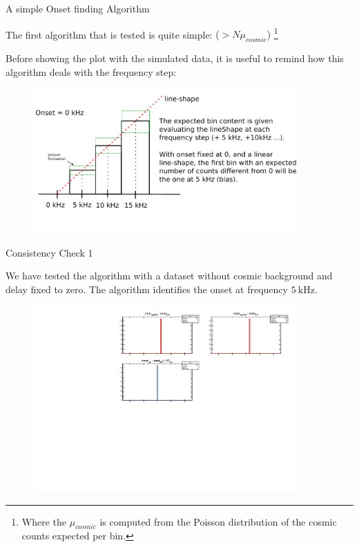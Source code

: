 \documentclass[9pt]{beamer}
\begin{document}
\begin{frame}{A simple Onset finding Algorithm}

The first algorithm that is tested is quite simple: { ($> N\mu_{cosmic}$)} \footnote{Where the $\mu_{cosmic}$ is computed from the Poisson distribution of the cosmic counts expected per bin.}

Before showing the plot with the simulated data, it is useful to remind how this algorithm deals with the frequency step:

\begin{figure}
\includegraphics[width = 0.9\textwidth]{ExplainingAlgorithm1.pdf}
\end{figure}
\end{frame}

\begin{frame}{Consistency Check 1}

We have tested the algorithm with a dataset without cosmic background and delay fixed to zero. The algorithm identifies the onset at frequency $\SI{5}{\kilo \hertz}$.

\begin{figure}
\includegraphics[width = 0.9\textwidth]{../Plot/OnsetResult.pdf}
\end{figure} 
\end{frame}
\end{document}
